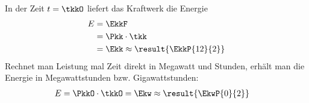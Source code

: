 In der Zeit $t = \tkkO$ liefert das Kraftwerk die Energie
\begin{align}
 E &= \EkkF \\
   &= \Pkk\cdot\tkk \\
   &= \Ekk \approx \result{\EkkP{12}{2}}
\end{align}
Rechnet man Leistung mal Zeit direkt in Megawatt und Stunden, erhält man die Energie in Megawattstunden bzw. Gigawattstunden:
\begin{align}
 E &= \PkkO\cdot\tkkO = \Ekw \approx \result{\EkwP{0}{2}}
\end{align}
